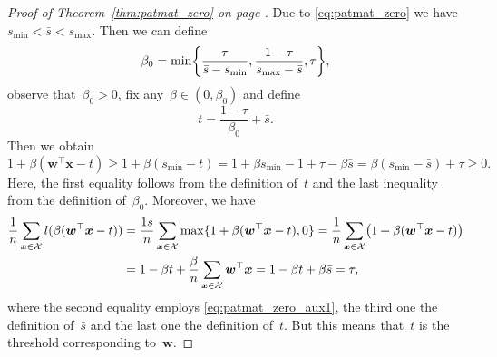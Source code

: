 \begin{proof}[Proof of Theorem~\ref{thm:patmat_zero} on page \pageref{thm:patmat_zero}]
  Due to \eqref{eq:patmat_zero} we have~$s_{\min} < \bar{s} < s_{\max}$. Then we can define
  \begin{equation*}
    \beta_0 = \min\Brac[c]{\frac{\tau}{\bar{s} - s_{\min}}, \frac{1-\tau}{s_{\max}-\bar{s}}, \tau},
  \end{equation*}
  observe that~$\beta_0>0$, fix any~$\beta\in(0,\beta_0)$ and define
  \begin{equation*}
    t = \frac{1-\tau}{\beta_0} + \bar{s}.
  \end{equation*}
  Then we obtain
  \begin{equation}\label{eq:patmat_zero_aux1}
    1+\beta(\bm{w}^\top\bm{x}-t) \ge 1+\beta(s_{\min}-t) = 1+\beta s_{\min}-1+\tau - \beta\bar{s} = \beta (s_{\min}-\bar{s})+\tau\ge 0.
  \end{equation}
  Here, the first equality follows from the definition of~$t$ and the last inequality from the definition of~$\beta_0$. Moreover, we have
  \begin{equation*}
    \begin{aligned}
      \frac{1}{n}\sum_{\bm{x} \in \Xc}l(\beta(\bm{w}^\top\bm{x}-t))
      & = \frac{1s}{n}\sum_{\bm{x} \in \Xc}\max\{1+\beta(\bm{w}^\top\bm{x}-t), 0\}
        = \frac{1}{n}\sum_{\bm{x} \in \Xc}\Brac{1+\beta(\bm{w}^\top\bm{x}-t)} \\
      & = 1-\beta t + \frac{\beta}{n}\sum_{\bm{x} \in \Xc}\bm{w}^\top\bm{x}
        = 1-\beta t + \beta\bar{s} = \tau,
    \end{aligned}
  \end{equation*}
  where the second equality employs \eqref{eq:patmat_zero_aux1}, the third one the definition of~$\bar{s}$ and the last one the definition of~$t$. But this means that~$t$ is the threshold corresponding to~$\bm{w}$.
  

\end{proof}
